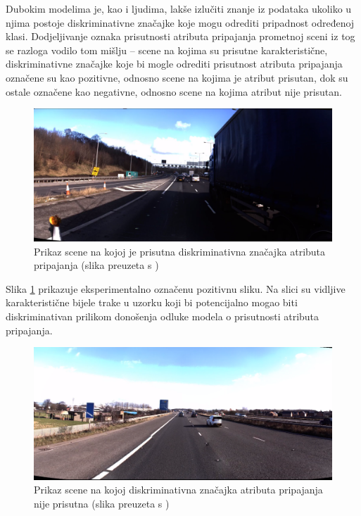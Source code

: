 \documentclass[times, utf8, diplomski, numeric]{fer}
\begin{document}
Dubokim modelima je, kao i ljudima, lakše izlučiti znanje iz podataka ukoliko u njima postoje diskriminativne značajke koje mogu odrediti pripadnost određenoj klasi.
Dodjeljivanje oznaka prisutnosti atributa pripajanja prometnoj sceni iz tog se razloga vodilo tom mišlju -- scene na kojima su prisutne karakteristične, diskriminativne značajke koje bi mogle odrediti prisutnost atributa pripajanja označene su kao pozitivne, odnosno scene na kojima je atribut prisutan, dok su ostale označene kao negativne, odnosno scene na kojima atribut nije prisutan.

\begin{figure}[H]
\centering
\includegraphics[scale=0.15]{images/hand_labeled_positive.png}
\caption{Prikaz scene na kojoj je prisutna diskriminativna značajka atributa pripajanja (slika preuzeta s \citep{url:ftts_irap})}
\label{img:hand_labeled_positive}
\end{figure}

\noindent Slika \ref{img:hand_labeled_positive} prikazuje eksperimentalno označenu pozitivnu sliku. 
Na slici su vidljive karakteristične bijele trake u uzorku koji bi potencijalno mogao biti diskriminativan prilikom donošenja odluke modela o prisutnosti atributa pripajanja.

\begin{figure}[H]
\centering
\includegraphics[scale=0.15]{images/hand_labeled_negative.png}
\caption{Prikaz scene na kojoj diskriminativna značajka atributa pripajanja nije prisutna (slika preuzeta s \citep{url:ftts_irap})}
\label{img:hand_labeled_negative}
\end{figure}
\end{document}

